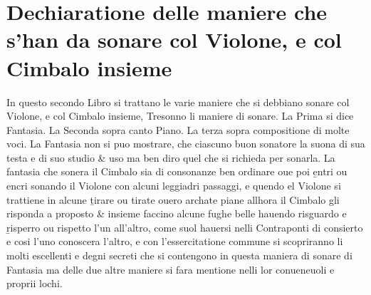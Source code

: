 
\chapter{Dechiaratione delle maniere che s'han da sonare col Violone, e col Cimbalo insieme}


In questo secondo Libro si trattano le varie maniere che si debbiano sonare col Violone, e col Cimbalo insieme, Tresonno li maniere di sonare. La Prima si dice Fantasia. La Seconda sopra canto Piano. La terza sopra compositione di molte voci. La Fantasia non si puo mostrare, che ciascuno buon sonatore la suona di sua testa e di suo studio \& uso ma ben diro quel che si richieda per sonarla. La fantasia che sonera il Cimbalo sia di consonanze ben ordinare oue poi \b{entri ou encri} sonando il Violone con alcuni leggiadri passaggi, e quendo el Violone si trattiene in alcune \b{tirare ou tirate} ouero archate piane allhora il Cimbalo gli risponda a proposto \& insieme faccino alcune fughe belle hauendo risguardo e \b{risperro ou rispetto} l'un all'altro, come suol hauersi nelli Contraponti di consierto e cosi l'uno conoscera l'altro, e con l'essercitatione commune si scopriranno li molti escellenti e degni secreti che si contengono in questa maniera di sonare di Fantasia ma delle due altre maniere si fara mentione nelli lor conueneuoli e proprii lochi.



